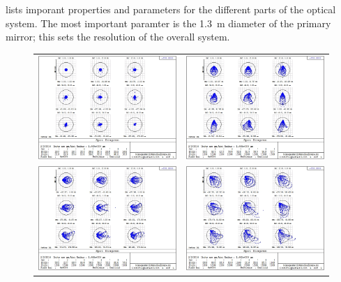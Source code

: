  lists imporant properties and parameters for the different parts of the optical system.
The most important paramter is the \SI{1.3}{\m} diameter of the primary mirror; this sets the resolution of the overall system.


\begin{figure}[th]
\centering
\begin{tabular}{lr}
\includegraphics[width=3in]{images/ch4-zemax-spot-0-0.jpg}
 &
\includegraphics[width=3in]{images/ch4-zemax-spot-1-0.jpg}
 \\
\includegraphics[width=3in]{images/ch4-zemax-spot-0-1.jpg}
 &
\includegraphics[width=3in]{images/ch4-zemax-spot-1-1.jpg}

\end{tabular}
\end{figure}
